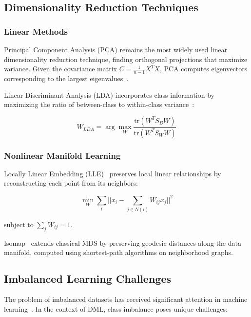 \documentclass[review]{elsarticle}
\begin{document}
\subsection{Dimensionality Reduction Techniques}

\subsubsection{Linear Methods}

Principal Component Analysis (PCA) remains the most widely used linear dimensionality reduction technique, finding orthogonal projections that maximize variance. Given the covariance matrix $C = \frac{1}{n-1}X^TX$, PCA computes eigenvectors corresponding to the largest eigenvalues~\cite{jolliffe2002principal}.

Linear Discriminant Analysis (LDA) incorporates class information by maximizing the ratio of between-class to within-class variance~\cite{belhumeur1997eigenfaces}:

\begin{equation}
W_{LDA} = \arg\max_W \frac{\text{tr}(W^T S_B W)}{\text{tr}(W^T S_W W)}
\end{equation}

\subsubsection{Nonlinear Manifold Learning}

Locally Linear Embedding (LLE)~\cite{roweis2000nonlinear} preserves local linear relationships by reconstructing each point from its neighbors:

\begin{equation}
\min_W \sum_i ||x_i - \sum_{j \in N(i)} W_{ij} x_j||^2
\end{equation}

subject to $\sum_j W_{ij} = 1$.

Isomap~\cite{tenenbaum2000global} extends classical MDS by preserving geodesic distances along the data manifold, computed using shortest-path algorithms on neighborhood graphs.

\subsection{Imbalanced Learning Challenges}

The problem of imbalanced datasets has received significant attention in machine learning~\cite{he2009learning}. In the context of DML, class imbalance poses unique challenges:
\end{document}
